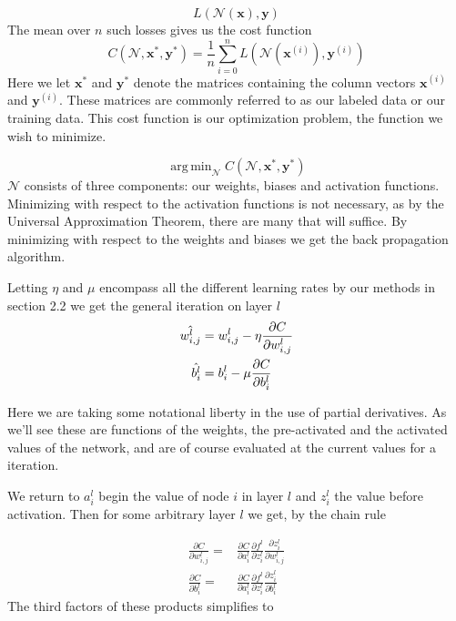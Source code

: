 \documentclass{article}
\theoremstyle{definition}
\DeclareMathOperator*{\argmin}{arg\,min}
\begin{document}
\[
L(\mathcal{N}(\boldsymbol{x}), \mathbf{y})
\]
The mean over $n$ such losses gives us the cost function
\[
C(\mathcal{N}, \boldsymbol{x}^*, \mathbf{y}^*) = \frac{1}{n} \sum_{i=0}^{n}L(\mathcal{N}(\boldsymbol{x}^{(i)}), \mathbf{y}^{(i)})
\]
Here we let $\mathbf{x}^*$ and $\mathbf{y}^*$ denote the matrices containing the column vectors $\mathbf{x}^{(i)}$ and $\mathbf{y}^{(i)}$. These matrices are commonly referred to as our labeled data or our training data. This cost function is our optimization problem, the function we wish to minimize. 

\[
\argmin_{\mathcal{N}} C(\mathcal{N}, \boldsymbol{x}^*, \mathbf{y}^*) 
\]
$\mathcal{N}$ consists of three components: our weights, biases and activation functions. Minimizing with respect to the activation functions is not necessary, as by the Universal Approximation Theorem, there are many that will suffice. By minimizing with respect to the weights and biases we get the back propagation algorithm.

Letting $\eta$ and $\mu$ encompass all the different learning rates by our methods in section 2.2 we get the general iteration on layer $l$
\begin{align*}
    \hat{w_{i,j}^{l}} =\hspace{1mm}&
    w_{i,j}^{l} - \eta \frac{\partial C}{\partial {w_{i,j}^{l}}}\\
    \hat{b_i^{l}} =\hspace{1mm}& b_i^{l} - \mu  \frac{\partial C}{\partial b_i^l} 
\end{align*}

Here we are taking some notational liberty in the use of partial derivatives. As we'll see these are functions of the weights, the pre-activated and the activated values of the network, and are of course evaluated at the current values for a iteration. 

 We return to $a_i^l$ begin the value of node $i$ in layer $l$ and $z_i^l$ the value before activation. Then for some arbitrary layer $l$ we get, by the chain rule

\begin{align}
    \frac{\partial C}{\partial w_{i,j}^l} =& \frac{\partial C}{\partial a_i^l} \frac{\partial f^l}{\partial z_i^l} \frac{\partial z_i^l}{\partial w_{i,j}^l} \label{eq:1} 
    \\
    \frac{\partial C}{\partial b_i^l} = & \frac{\partial C}{\partial a_i^l} \frac{\partial f^l}{\partial z_i^l} \frac{\partial z_i^l}{\partial b_i^l} \label{eq:2} 
\end{align}
The third factors of these products simplifies to
\end{document}
